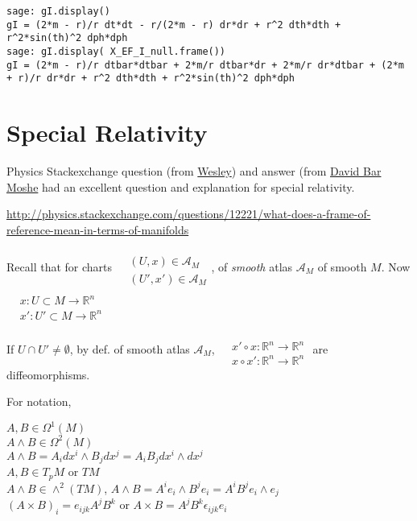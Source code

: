 \documentclass[10pt, twoside]{amsart}
\begin{document}
\begin{multicols*}{2}
\begin{lstlisting}[frame=single]
sage: gI.display()
gI = (2*m - r)/r dt*dt - r/(2*m - r) dr*dr + r^2 dth*dth + r^2*sin(th)^2 dph*dph
sage: gI.display( X_EF_I_null.frame())
gI = (2*m - r)/r dtbar*dtbar + 2*m/r dtbar*dr + 2*m/r dr*dtbar + (2*m + r)/r dr*dr + r^2 dth*dth + r^2*sin(th)^2 dph*dph
\end{lstlisting}



\part{Special Relativity}

Physics Stackexchange question (from \href{http://physics.stackexchange.com/users/4249/wesley}{Wesley}) and answer (from \href{http://physics.stackexchange.com/users/2190/david-bar-moshe}{David Bar Moshe} had an excellent question and explanation for special relativity.  

\url{http://physics.stackexchange.com/questions/12221/what-does-a-frame-of-reference-mean-in-terms-of-manifolds}



Recall that for charts $\begin{aligned} & \quad \\
  & (U,x) \in \mathcal{A}_M \\
  & (U',x') \in \mathcal{A}_M \end{aligned}$, of \emph{smooth} atlas $\mathcal{A}_M$ of smooth $M$.  Now $\begin{aligned} & \quad \\
  & x : U \subset M \to \mathbb{R}^n \\
  & x':U' \subset M \to \mathbb{R}^n \end{aligned}$ 

If $U \cap U'\neq \emptyset$, by def. of smooth atlas $\mathcal{A}_M$, $\begin{aligned} & \quad \\
  & x'\circ x : \mathbb{R}^n \to \mathbb{R}^n \\
  & x\circ x' : \mathbb{R}^n \to \mathbb{R}^n \end{aligned}$ are diffeomorphisms.

For notation, 


$A,B \in \Omega^1(M)$ \\
$A \wedge B \in \Omega^2(M)$ \\
$A\wedge B = A_i dx^i \wedge B_j dx^j =A_iB_j dx^i \wedge dx^j$  \\
$A,B \in T_pM$ or $TM$ \\
$A \wedge B \in \wedge^2(TM)$, $A\wedge B = A^i e_i \wedge B^j e_i = A^i B^j e_i \wedge e_j$ \\
$(A\times B)_i = e_{ijk} A^j B^k$ or $A\times B = A^j B^k \epsilon_{ijk} e_i$


\end{multicols*}
\end{document}
